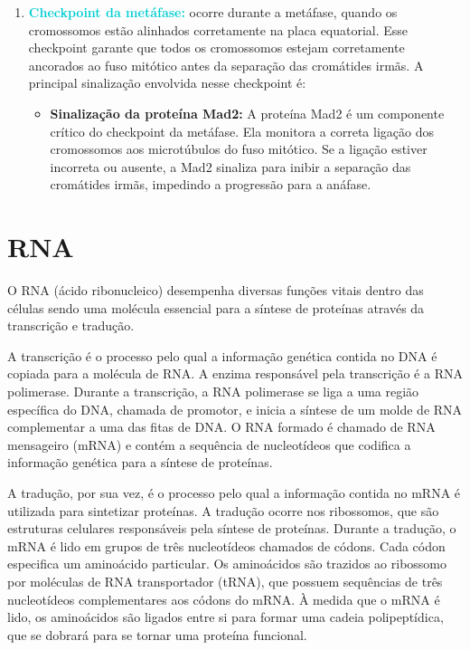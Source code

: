 \documentclass[11pt,a4paper]{article}
\begin{document}
\begin{enumerate}
\begin{itemize}[label=\textcolor{CarnationPink}{$\star$}]
			\end{itemize}
		\item \textcolor{DarkTurquoise}{\textbf{Checkpoint da metáfase:}} ocorre durante a metáfase, quando os cromossomos estão alinhados corretamente na placa equatorial. Esse checkpoint garante que todos os cromossomos estejam corretamente ancorados ao fuso mitótico antes da separação das cromátides irmãs. A principal sinalização envolvida nesse checkpoint é:
			\begin{itemize}[label=\textcolor{CarnationPink}{$\star$}]
				\item \textbf{Sinalização da proteína Mad2:} A proteína Mad2 é um componente crítico do checkpoint da metáfase. Ela monitora a correta ligação dos cromossomos aos microtúbulos do fuso mitótico. Se a ligação estiver incorreta ou ausente, a Mad2 sinaliza para inibir a separação das cromátides irmãs, impedindo a progressão para a anáfase.
			\end{itemize}
	\end{enumerate}

	\section{RNA}

	O RNA (ácido ribonucleico) desempenha diversas funções vitais dentro das células sendo uma molécula essencial para a síntese de proteínas através da transcrição e tradução.
	
	A transcrição é o processo pelo qual a informação genética contida no DNA é copiada para a molécula de RNA. A enzima responsável pela transcrição é a RNA polimerase. Durante a transcrição, a RNA polimerase se liga a uma região específica do DNA, chamada de promotor, e inicia a síntese de um molde de RNA complementar a uma das fitas de DNA. O RNA formado é chamado de RNA mensageiro (mRNA) e contém a sequência de nucleotídeos que codifica a informação genética para a síntese de proteínas.

	A tradução, por sua vez, é o processo pelo qual a informação contida no mRNA é utilizada para sintetizar proteínas. A tradução ocorre nos ribossomos, que são estruturas celulares responsáveis pela síntese de proteínas. Durante a tradução, o mRNA é lido em grupos de três nucleotídeos chamados de códons. Cada códon especifica um aminoácido particular. Os aminoácidos são trazidos ao ribossomo por moléculas de RNA transportador (tRNA), que possuem sequências de três nucleotídeos complementares aos códons do mRNA. À medida que o mRNA é lido, os aminoácidos são ligados entre si para formar uma cadeia polipeptídica, que se dobrará para se tornar uma proteína funcional.
\end{document}
